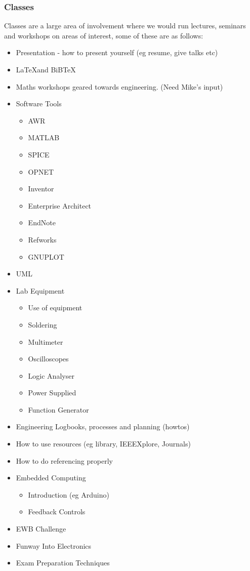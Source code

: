 \subsubsection{Classes}
Classes are a large area of involvement where we would run lectures, seminars
and workshops on areas of interest, some of these are as follows:
\begin{itemize}
  \item Presentation - how to present yourself (eg resume, give talks etc)
  \item \LaTeX and BiBTeX
  \item Maths workshops geared towards engineering. (Need Mike's input)
  \item Software Tools
  \begin{itemize}
    \item AWR
    \item MATLAB
    \item SPICE
    \item OPNET
    \item Inventor
    \item Enterprise Architect
    \item EndNote
    \item Refworks
    \item GNUPLOT
  \end{itemize}
  \item UML
  \item Lab Equipment
  \begin{itemize}
    \item Use of equipment
    \item Soldering
    \item Multimeter
    \item Oscilloscopes
    \item Logic Analyser
    \item Power Supplied
    \item Function Generator
  \end{itemize}
  \item Engineering Logbooks, processes and planning (howtos)
  \item How to use resources (eg library, IEEEXplore, Journals)
  \item How to do referencing properly
  \item Embedded Computing
  \begin{itemize}
    \item Introduction (eg Arduino)
    \item Feedback Controls
  \end{itemize}
  \item EWB Challenge
  \item Funway Into Electronics
  \item Exam Preparation Techniques
\end{itemize}

